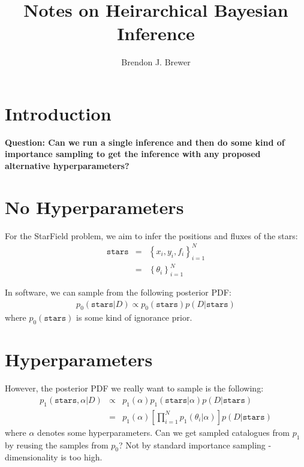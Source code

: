 \documentclass[letterpaper, 11pt]{article}
\title{Notes on Heirarchical Bayesian Inference}
\author{Brendon J. Brewer}
\newcommand{\stars}{\texttt{stars}}
\begin{document}
\maketitle

\section{Introduction}
{\bf Question: Can we run a single inference and then do some kind of importance
sampling to get the inference with any proposed alternative hyperparameters?}

\section{No Hyperparameters}
For the StarField problem, we aim to infer the positions and fluxes of the
stars:
\begin{eqnarray}
\stars &=& \left\{x_i, y_i, f_i\right\}_{i=1}^N \\
&=& \left\{\theta_i\right\}_{i=1}^N
\end{eqnarray}

In software, we can sample from the following posterior PDF:
\begin{eqnarray}
p_0(\stars | D) \propto p_0(\stars) p(D|\stars)
\end{eqnarray}
where $p_0(\stars)$ is some kind of ignorance prior.

\section{Hyperparameters}
However, the posterior PDF we really want to sample is the following:
\begin{eqnarray}
p_1(\stars, \alpha | D) &\propto& p_1(\alpha)p_1(\stars|\alpha) p(D|\stars)\\
&=& p_1(\alpha)\left[\prod_{i=1}^N p_1(\theta_i|\alpha)\right] p(D|\stars)
\end{eqnarray}
where $\alpha$ denotes some hyperparameters. Can we get sampled catalogues from
$p_1$ by reusing the samples from $p_0$? Not by standard importance sampling -
dimensionality is too high.
\end{document}
